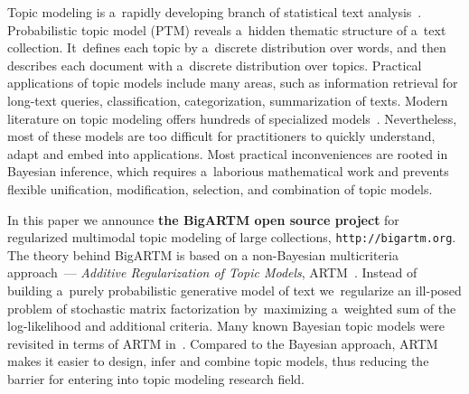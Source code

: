 \documentclass[russian,english]{llncs}
\begin{document}
Topic modeling is a~rapidly developing branch of statistical text analysis~\cite{blei12ptm}.
Probabilistic topic model (PTM) reveals a~hidden thematic structure of a~text collection.
It~defines each topic by a~discrete distribution over words,
and then describes each document with a~discrete distribution over topics.
Practical applications of topic models include many areas, such as
information retrieval for long-text queries,
classification, categorization, summarization of texts.
Modern literature on topic modeling offers hundreds of specialized models~\cite{daud10knowledge}.
Nevertheless,
most of these models are too difficult for practitioners
to quickly understand, adapt and embed into applications.
Most practical inconveniences are rooted in Bayesian inference, 
which requires a~laborious mathematical work and prevents 
flexible unification, modification, selection, and combination of topic models.

In this paper we announce \textbf{the BigARTM open source project} for
regularized multimodal topic modeling of large collections,
\texttt{http://bigartm.org}.
The theory behind BigARTM is based on a non-Bayesian multicriteria approach~---
\emph{Additive Regularization of Topic Models}, ARTM~\cite{voron14dan-eng}.
Instead of building a~purely probabilistic generative model of text
we~regularize an ill-posed problem of stochastic matrix factorization
by~maximizing a~weighted sum of the log-likelihood and additional criteria.
Many known Bayesian topic models were revisited in terms of ARTM in~\cite{voron14mlj,voron14aist}.
Compared to the Bayesian approach,
ARTM makes it easier to design, infer and combine topic models,
thus reducing the barrier for entering into topic modeling research field.

%
\end{document}
